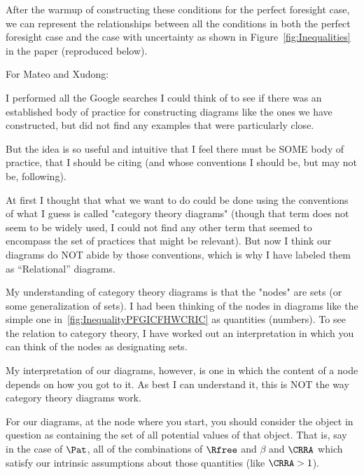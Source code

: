 \documentclass[\econtexRoot/BufferStockTheory]{subfiles}
\begin{document}
After the warmup of constructing these conditions for the perfect foresight case, we can represent the relationships between all the conditions in both the perfect foresight case and the case with uncertainty as shown in Figure~\ref{fig:Inequalities} in the paper (reproduced below).

\renewcommand{\figName}{Inequalities} %
\renewcommand{\figFile}{\figName} %
\hypertarget{\figFile}{}
\hypertarget{\figName}{}

\begin{CDCPrivate}
  \pagebreak


  For Mateo and Xudong:
  
  I performed all the Google searches I could think of to see if there was an established body of practice for constructing diagrams like the ones we have constructed, but did not find any examples that were particularly close.  

  But the idea is so useful and intuitive that I feel there must be SOME body of practice, that I should be citing (and whose conventions I should be, but may not be, following).

  At first I thought that what we want to do could be done using the conventions of what I guess is called "category theory diagrams" (though that term does not seem to be widely used, I could not find any other term that seemed to encompass the set of practices that might be relevant). But now I think our diagrams do NOT abide by those conventions, which is why I have labeled them as ``Relational'' diagrams.

  My understanding of category theory diagrams is that the "nodes" are sets (or some generalization of sets). I had been thinking of the nodes in diagrams like the simple one in~\ref{fig:InequalityPFGICFHWCRIC} as quantities (numbers).  To see the relation to category theory, I have worked out an interpretation in which you can think of the nodes as designating sets.

  My interpretation of our diagrams, however, is one in which the content of a node depends on how you got to it. As best I can understand it, this is NOT the way category theory diagrams work.

  For our diagrams, at the node where you start, you should consider the object in question as containing the set of all potential values of that object. That is, say in the case of $\Pat$, all of the combinations of $\Rfree$ and $\beta$ and $\CRRA$ which satisfy our intrinsic assumptions about those quantities (like $\CRRA > 1$).


\end{CDCPrivate}
\end{document}
